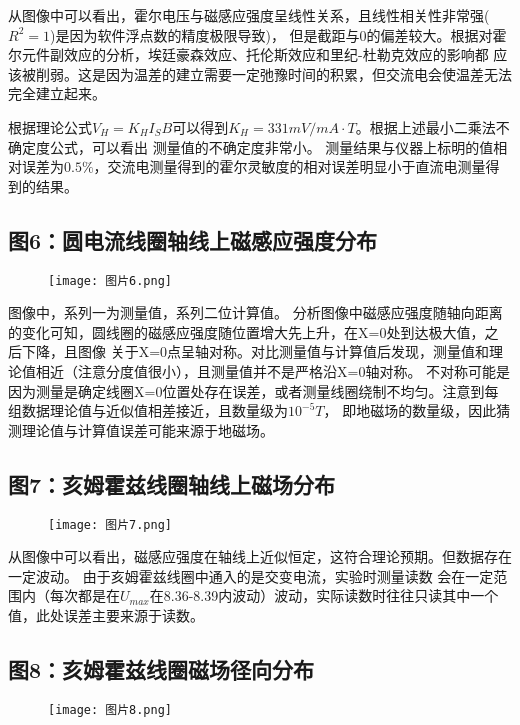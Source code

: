 \documentclass[12pt,a4paper]{article}
\begin{document}
    从图像中可以看出，霍尔电压与磁感应强度呈线性关系，且线性相关性非常强($R^2=1$)是因为软件浮点数的精度极限导致)，
    但是截距与0的偏差较大。根据对霍尔元件副效应的分析，埃廷豪森效应、托伦斯效应和里纪-杜勒克效应的影响都
    应该被削弱。这是因为温差的建立需要一定弛豫时间的积累，但交流电会使温差无法完全建立起来。\par
    根据理论公式${V_H} = {K_H}{I_S}B$可以得到$K_H=331mV/mA\cdot{T}$。根据上述最小二乘法不确定度公式，可以看出
    测量值的不确定度非常小。
    测量结果与仪器上标明的值相对误差为$0.5\%$，交流电测量得到的霍尔灵敏度的相对误差明显小于直流电测量得到的结果。

    \subsection{图6：圆电流线圈轴线上磁感应强度分布}
    \begin{figure}[H]
        \centering
        \texttt{[image: 图片6.png]}
    \end{figure}
    图像中，系列一为测量值，系列二位计算值。
    分析图像中磁感应强度随轴向距离的变化可知，圆线圈的磁感应强度随位置增大先上升，在X=0处到达极大值，之后下降，且图像
    关于X=0点呈轴对称。对比测量值与计算值后发现，测量值和理论值相近（注意分度值很小），且测量值并不是严格沿X=0轴对称。
    不对称可能是因为测量是确定线圈X=0位置处存在误差，或者测量线圈绕制不均匀。注意到每组数据理论值与近似值相差接近，且数量级为$10^{-5}T$，
    即地磁场的数量级，因此猜测理论值与计算值误差可能来源于地磁场。

    \subsection{图7：亥姆霍兹线圈轴线上磁场分布}
    \begin{figure}[H]
        \centering
        \texttt{[image: 图片7.png]}
    \end{figure}

    从图像中可以看出，磁感应强度在轴线上近似恒定，这符合理论预期。但数据存在一定波动。
    由于亥姆霍兹线圈中通入的是交变电流，实验时测量读数
    会在一定范围内（每次都是在$U_{max}$在8.36-8.39内波动）波动，实际读数时往往只读其中一个值，此处误差主要来源于读数。

    \subsection{图8：亥姆霍兹线圈磁场径向分布}
    \begin{figure}[H]
        \centering
        \texttt{[image: 图片8.png]}
    \end{figure}
\end{document}
